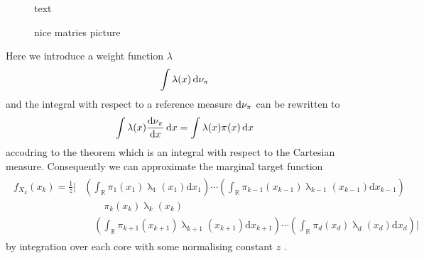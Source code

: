 \begin{figure}[ht!]
	\centering
{} 
\caption{text}
\label{fig:TTtikz}
\end{figure}
\begin{figure}[ht!]
	\centering

	\caption{nice matries picture \cite{fox2021grid}}
	\label{fig:TTdraw}
	
\end{figure}
Here we introduce a weight function $\lambda$
\begin{align}
	\int \lambda(x) \mathop{}\!\mathrm{d} \nu_{\pi}
\end{align}
and the integral with respect to a reference measure $\mathop{}\!\mathrm{d} \nu_{\pi}$ can be rewritten to
\begin{align}
	\int \lambda(x) \frac{\mathop{}\!\mathrm{d} \nu_{\pi} }{\mathop{}\!\mathrm{d} x} \mathop{}\!\mathrm{d} x = \int \lambda(x) \pi(x) \mathop{}\!\mathrm{d} x
\end{align}
accodring to the theorem which is an integral with respect to the Cartesian measure.
Consequently we can approximate the marginal target function
\begin{align}
	\begin{split}
	f_{X_k}(x_k) = \frac{1}{z}
	\Big|  &\left( \int_{\mathbb{R}} \pi_{1}(x_1) \uplambda_1(x_1)\text{d}x_{1} \right) \cdots \left( \int_{\mathbb{R}} \pi_{k-1}(x_{k-1}) \uplambda_{k-1}(x_{k-1}) \text{d}x_{k-1} \right) \\ & \qquad \pi_{k}(x_k)\uplambda_k(x_{k}) \\ &\quad \left( \int_{\mathbb{R}} \pi_{k+1}(x_{k+1})\uplambda_{k+1}(x_{k+1})\text{d}x_{k+1} \right) \cdots  \left( \int_{\mathbb{R}} \pi_{d}(x_d)\uplambda_d(x_{d})\text{d}x_d \right) \Big| \, 
	\end{split} 
\end{align}  
by integration over each core \cite{dolgov2020approximation} with some normalising constant $z$ \cite{cui2022deep}.
\\


